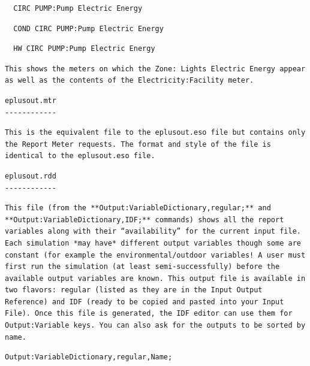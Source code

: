 \begin{lstlisting}
  CIRC PUMP:Pump Electric Energy
\end{lstlisting}

\begin{lstlisting}
  COND CIRC PUMP:Pump Electric Energy
\end{lstlisting}

\begin{lstlisting}
  HW CIRC PUMP:Pump Electric Energy
\end{lstlisting}

\begin{lstlisting}
This shows the meters on which the Zone: Lights Electric Energy appear as well as the contents of the Electricity:Facility meter.
\end{lstlisting}

\begin{lstlisting}
eplusout.mtr
------------
\end{lstlisting}

\begin{lstlisting}
This is the equivalent file to the eplusout.eso file but contains only the Report Meter requests. The format and style of the file is identical to the eplusout.eso file.
\end{lstlisting}

\begin{lstlisting}
eplusout.rdd
------------
\end{lstlisting}

\begin{lstlisting}
This file (from the **Output:VariableDictionary,regular;** and **Output:VariableDictionary,IDF;** commands) shows all the report variables along with their “availability” for the current input file. Each simulation *may have* different output variables though some are constant (for example the environmental/outdoor variables! A user must first run the simulation (at least semi-successfully) before the available output variables are known. This output file is available in two flavors: regular (listed as they are in the Input Output Reference) and IDF (ready to be copied and pasted into your Input File). Once this file is generated, the IDF editor can use them for Output:Variable keys. You can also ask for the outputs to be sorted by name.
\end{lstlisting}

\begin{lstlisting}
Output:VariableDictionary,regular,Name;
\end{lstlisting}


